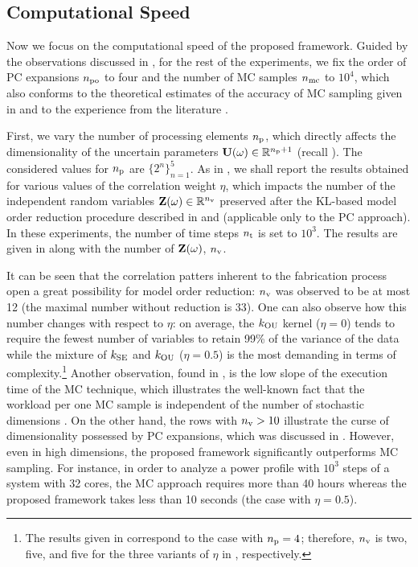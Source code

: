 \subsection{Computational Speed}

Now we focus on the computational speed of the proposed framework.
Guided by the observations discussed in , for the rest of the experiments, we fix the order of PC expansions ${n_\text{po}}$ to four and the number of MC samples ${n_\text{mc}}$ to $10^4$, which also conforms to the theoretical estimates of the accuracy of MC sampling given in \cite{diaz-emparanza2002} and to the experience from the literature \cite{xiu2010, maitre2010, shen2009, eldred2008}.

First, we vary the number of processing elements ${n_\text{p}}$, which directly affects the dimensionality of the uncertain parameters $\mathbf{U}(\omega) \in \mathbb{R}^{{n_\text{p}} + 1}$ (recall ).
The considered values for ${n_\text{p}}$ are $\{ 2^n \}_{n = 1}^5$.
As in , we shall report the results obtained for various values of the correlation weight $\eta$, which impacts the number of the independent random variables $\mathbf{Z}(\omega) \in \mathbb{R}^{n_\text{v}}$ preserved after the KL-based model order reduction procedure described in  and  (applicable only to the PC approach).
In these experiments, the number of time steps ${n_\text{t}}$ is set to $10^3$.
The results are given in  along with the number of $\mathbf{Z}(\omega)$, ${n_\text{v}}$.

It can be seen that the correlation patters inherent to the fabrication process \cite{cheng2011} open a great possibility for model order reduction: ${n_\text{v}}$ was observed to be at most 12 (the maximal number without reduction is 33).
One can also observe how this number changes with respect to $\eta$: on average, the $\fCorr_\OU$ kernel ($\eta = 0$) tends to require the fewest number of variables to retain 99\% of the variance of the data while the mixture of $\fCorr_\SE$ and $\fCorr_\OU$ ($\eta = 0.5$) is the most demanding in terms of complexity.\footnote{The results given in  correspond to the case with ${n_\text{p}} = 4$; therefore, ${n_\text{v}}$ is two, five, and five for the three variants of $\eta$ in , respectively.}
Another observation, found in , is the low slope of the execution time of the MC technique, which illustrates the well-known fact that the workload per one MC sample is independent of the number of stochastic dimensions \cite{maitre2010}.
On the other hand, the rows with ${n_\text{v}} > 10$ illustrate the curse of dimensionality possessed by PC expansions, which was discussed in .
However, even in high dimensions, the proposed framework significantly outperforms MC sampling. For instance, in order to analyze a power profile with $10^3$ steps of a system with 32 cores, the MC approach requires more than 40 hours whereas the proposed framework takes less than 10 seconds (the case with $\eta = 0.5$).


